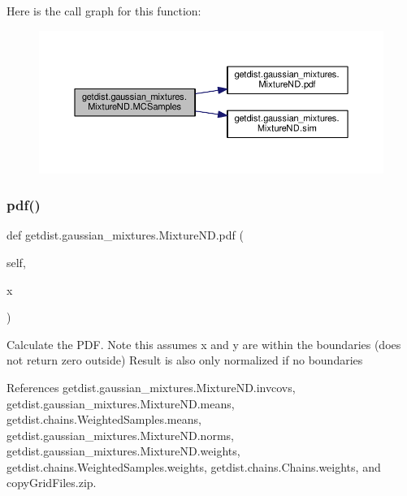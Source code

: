 Here is the call graph for this function\+:
\nopagebreak
\begin{figure}[H]
\begin{center}
\leavevmode
\includegraphics[width=350pt]{classgetdist_1_1gaussian__mixtures_1_1MixtureND_aa21545c325ae1162596655b4f4425acb_cgraph}
\end{center}
\end{figure}
\mbox{\label{classgetdist_1_1gaussian__mixtures_1_1MixtureND_af0a646f4166c5e7183084e5fbea8b0b9}} 
\subsubsection{\texorpdfstring{pdf()}{pdf()}}
{\footnotesize\ttfamily def getdist.\+gaussian\+\_\+mixtures.\+Mixture\+N\+D.\+pdf (\begin{DoxyParamCaption}\item[{}]{self,  }\item[{}]{x }\end{DoxyParamCaption})}

\begin{DoxyVerb}Calculate the PDF. Note this assumes x and y are within the boundaries (does not return zero outside)
Result is also only normalized if no boundaries
\end{DoxyVerb}
 

References getdist.\+gaussian\+\_\+mixtures.\+Mixture\+N\+D.\+invcovs, getdist.\+gaussian\+\_\+mixtures.\+Mixture\+N\+D.\+means, getdist.\+chains.\+Weighted\+Samples.\+means, getdist.\+gaussian\+\_\+mixtures.\+Mixture\+N\+D.\+norms, getdist.\+gaussian\+\_\+mixtures.\+Mixture\+N\+D.\+weights, getdist.\+chains.\+Weighted\+Samples.\+weights, getdist.\+chains.\+Chains.\+weights, and copy\+Grid\+Files.\+zip.



